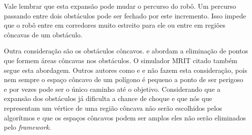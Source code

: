 Vale lembrar que esta expansão pode mudar o percurso do robô. Um percurso passando entre dois obstáculos pode ser fechado por este incremento. Isso impede que o robô entre em corredores muito estreito para ele ou entre em regiões côncavas de um obstáculo.

Outra consideração são os obstáculos côncavos. \cite{Siegwart2004} e \cite{Guzman2008} abordam a eliminação de pontos que formem áreas côncavas nos obstáculos. O simulador MRIT citado também segue esta abordagem. Outros autores como \cite{Thomsen2010} e \cite{Choset2005} e  não fazem esta consideração, pois nem sempre o espaço côncavo de um polígono é pequeno a ponto de ser perigoso e por vezes pode ser o único caminho até o objetivo. Considerando que a expansão dos obstáculos já dificulta a chance de choque e que nós que representam um vértice de uma região côncava não serão escolhidos pelos algorítmos e que os espaços côncavos podem ser amplos eles não serão eliminados pelo \textit{framework}.